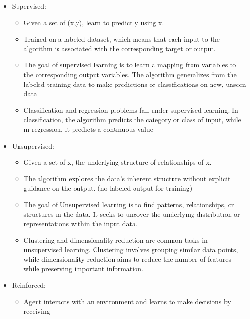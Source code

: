 \documentclass[letterpaper,12pt]{article}
\begin{document}
\begin{itemize}
    \item Supervised:
          \begin{itemize}
              \item Given a set of (x,y), learn to predict y using x.
              \item Trained on a labeled dataset, which means that each input to the algorithm is
                    associated with the corresponding target or output.
              \item The goal of supervised learning is to learn a mapping from variables to the
                    corresponding output variables. The algorithm generalizes from the labeled
                    training data to make predictions or classifications on new, unseen data.
              \item Classification and regression problems fall under supervised learning. In
                    classification, the algorithm predicts the category or class of input, while
                    in regression, it predicts a continuous value.
          \end{itemize}
    \item Unsupervised:
          \begin{itemize}
              \item Given a set of x, the underlying structure of relationships of x.
              \item The algorithm explores the data's inherent structure without explicit guidance
                    on the output. (no labeled output for training)
              \item The goal of Unsupervised learning is to find patterns, relationships, or
                    structures in the data. It seeks to uncover the underlying distribution or
                    representations within the input data.
              \item Clustering and dimensionality reduction are common tasks in unsupervised
                    learning. Clustering involves grouping similar data points, while
                    dimensionality reduction aims to reduce the number of features while preserving
                    important information.
          \end{itemize}
    \item Reinforced:
          \begin{itemize}
              \item Agent interacts with an environment and learns to make decisions by receiving

\end{itemize}
\end{itemize}
\end{document}
